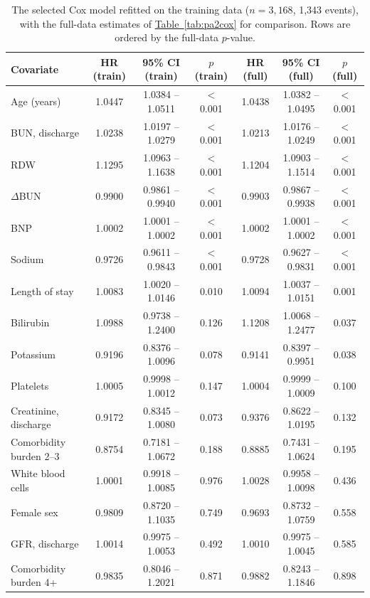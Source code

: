 \documentclass[11pt,a4paper]{article}
\newcommand{\tabref}[1]{\hyperref[#1]{Table~\ref*{#1}}}
\newcommand{\dbun}{$\Delta$BUN}
\begin{document}
\begin{table}[H]
\centering
\caption{The selected Cox model refitted on the training data
($n = 3{,}168$, 1,343 events), with the full-data estimates of \tabref{tab:pa2cox} for comparison. Rows
are ordered by the full-data $p$-value.}
\label{tab:coxtrain}
\vspace{0.3em}
\footnotesize
\begin{tabular}{lcccccc}
\toprule
Covariate & HR (train) & 95\% CI (train) & $p$ (train) & HR (full) & 95\% CI (full) & $p$ (full) \\
\midrule
Age (years)             & 1.0447 & 1.0384 -- 1.0511 & $<$ 0.001 & 1.0438 & 1.0382 -- 1.0495 & $<$ 0.001 \\
BUN, discharge          & 1.0238 & 1.0197 -- 1.0279 & $<$ 0.001 & 1.0213 & 1.0176 -- 1.0249 & $<$ 0.001 \\
RDW                     & 1.1295 & 1.0963 -- 1.1638 & $<$ 0.001 & 1.1204 & 1.0903 -- 1.1514 & $<$ 0.001 \\
\dbun{}                 & 0.9900 & 0.9861 -- 0.9940 & $<$ 0.001 & 0.9903 & 0.9867 -- 0.9938 & $<$ 0.001 \\
BNP                     & 1.0002 & 1.0001 -- 1.0002 & $<$ 0.001 & 1.0002 & 1.0001 -- 1.0002 & $<$ 0.001 \\
Sodium                  & 0.9726 & 0.9611 -- 0.9843 & $<$ 0.001 & 0.9728 & 0.9627 -- 0.9831 & $<$ 0.001 \\
Length of stay          & 1.0083 & 1.0020 -- 1.0146 & 0.010 & 1.0094 & 1.0037 -- 1.0151 & 0.001 \\
Bilirubin               & 1.0988 & 0.9738 -- 1.2400 & 0.126 & 1.1208 & 1.0068 -- 1.2477 & 0.037 \\
Potassium               & 0.9196 & 0.8376 -- 1.0096 & 0.078 & 0.9141 & 0.8397 -- 0.9951 & 0.038 \\
Platelets               & 1.0005 & 0.9998 -- 1.0012 & 0.147 & 1.0004 & 0.9999 -- 1.0009 & 0.100 \\
Creatinine, discharge   & 0.9172 & 0.8345 -- 1.0080 & 0.073 & 0.9376 & 0.8622 -- 1.0195 & 0.132 \\
Comorbidity burden 2--3 & 0.8754 & 0.7181 -- 1.0672 & 0.188 & 0.8885 & 0.7431 -- 1.0624 & 0.195 \\
White blood cells       & 1.0001 & 0.9918 -- 1.0085 & 0.976 & 1.0028 & 0.9958 -- 1.0098 & 0.436 \\
Female sex              & 0.9809 & 0.8720 -- 1.1035 & 0.749 & 0.9693 & 0.8732 -- 1.0759 & 0.558 \\
GFR, discharge          & 1.0014 & 0.9975 -- 1.0053 & 0.492 & 1.0010 & 0.9975 -- 1.0045 & 0.585 \\
Comorbidity burden 4+   & 0.9835 & 0.8046 -- 1.2021 & 0.871 & 0.9882 & 0.8243 -- 1.1846 & 0.898 \\
\bottomrule
\end{tabular}
\end{table}
\end{document}
